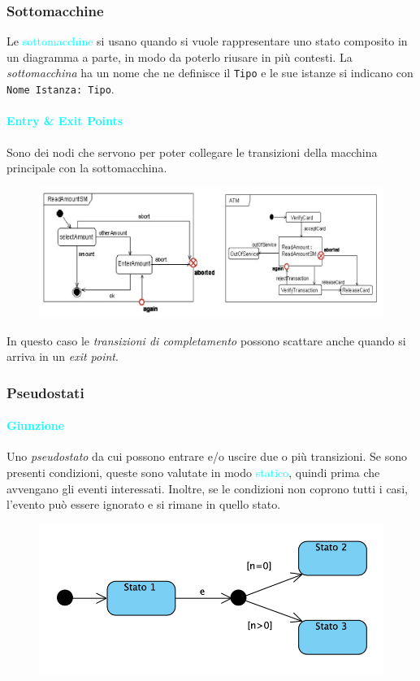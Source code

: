 \subsubsection{Sottomacchine}
Le \textcolor{cyan}{sottomacchine} si usano quando si vuole rappresentare
uno stato composito in un diagramma a parte, in modo da poterlo riusare in più contesti.
La \emph{sottomacchina} ha un nome che ne definisce il \verb|Tipo| e le sue istanze
si indicano con \verb|Nome Istanza: Tipo|.

\paragraph{\textcolor{cyan}{Entry \& Exit Points}} Sono dei nodi che servono per poter collegare le transizioni
della macchina principale con la sottomacchina.

\begin{figure}[H]
    \centering
    \includegraphics[scale=0.33]{img/sottomacchine.png}
\end{figure}

In questo caso le \emph{transizioni di completamento} possono scattare anche quando si arriva in un \emph{exit point}. 

\subsubsection{Pseudostati}

\paragraph{\textcolor{cyan}{Giunzione}} Uno \emph{pseudostato} da cui possono entrare e/o uscire due o più transizioni.
Se sono presenti condizioni, queste sono valutate in modo \textcolor{cyan}{statico}, quindi prima che avvengano gli eventi interessati.
Inoltre, se le condizioni non coprono tutti i casi, l'evento può essere ignorato e si rimane in quello stato.

\begin{figure}[H]
    \centering
    \includegraphics[scale=0.7]{img/giunzione.png}
\end{figure}

